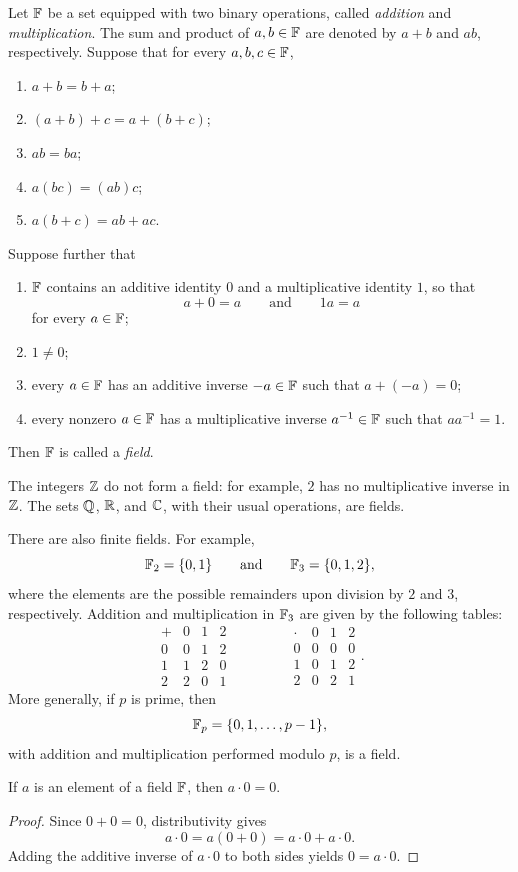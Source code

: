 \begin{definition}[Field]
  Let $\mathbb{F}$ be a set equipped with two binary operations, called
  \emph{addition} and \emph{multiplication}. The sum and product of
  $a,b\in\mathbb{F}$ are denoted by $a+b$ and $ab$, respectively. Suppose that
  for every $a,b,c\in\mathbb{F}$,
  \begin{enumerate}[label=(\roman*)]
    \item $a+b=b+a$;
    \item $(a+b)+c=a+(b+c)$;
    \item $ab=ba$;
    \item $a(bc)=(ab)c$;
    \item $a(b+c)=ab+ac$.
  \end{enumerate}
  Suppose further that
  \begin{enumerate}[label=(\roman*),resume]
    \item $\mathbb{F}$ contains an additive identity $0$ and a multiplicative
      identity $1$, so that
      \[
        a+0=a \qquad\text{and}\qquad 1a=a
      \]
      for every $a\in\mathbb{F}$;
    \item $1\neq 0$;
    \item every $a\in\mathbb{F}$ has an additive inverse $-a\in\mathbb{F}$ such
      that $a+(-a)=0$;
    \item every nonzero $a\in\mathbb{F}$ has a multiplicative inverse
      $a^{-1}\in\mathbb{F}$ such that $aa^{-1}=1$.
  \end{enumerate}
  Then $\mathbb{F}$ is called a \emph{field}.
\end{definition}

\begin{example}
  The integers $\mathbb{Z}$ do not form a field: for example, $2$ has no
  multiplicative inverse in $\mathbb{Z}$. The sets $\mathbb{Q}$, $\mathbb{R}$, and
  $\mathbb{C}$, with their usual operations, are fields.
\end{example}

There are also finite fields. For example,
\[
  \mathbb{F}_2=\{0,1\}
  \qquad\text{and}\qquad
  \mathbb{F}_3=\{0,1,2\},
\]
where the elements are the possible remainders upon division by $2$ and
$3$, respectively. Addition and multiplication in $\mathbb{F}_3$ are given by
the following tables:
\[
\begin{array}{c|ccc}
  + & 0 & 1 & 2 \\
  \hline
  0 & 0 & 1 & 2 \\
  1 & 1 & 2 & 0 \\
  2 & 2 & 0 & 1
\end{array}
\qquad\qquad
\begin{array}{c|ccc}
  \cdot & 0 & 1 & 2 \\
  \hline
  0 & 0 & 0 & 0 \\
  1 & 0 & 1 & 2 \\
  2 & 0 & 2 & 1
\end{array}.
\]
More generally, if $p$ is prime, then
\[
  \mathbb{F}_p=\{0,1,\ldots,p-1\},
\]
with addition and multiplication performed modulo $p$, is a field.

\begin{lemma}
  If $a$ is an element of a field $\mathbb{F}$, then $a\cdot 0=0$.
\end{lemma}

\begin{proof}
  Since $0+0=0$, distributivity gives
  \[
    a\cdot 0=a(0+0)=a\cdot 0+a\cdot 0.
  \]
  Adding the additive inverse of $a\cdot 0$ to both sides yields
  $0=a\cdot 0$.
\end{proof}
